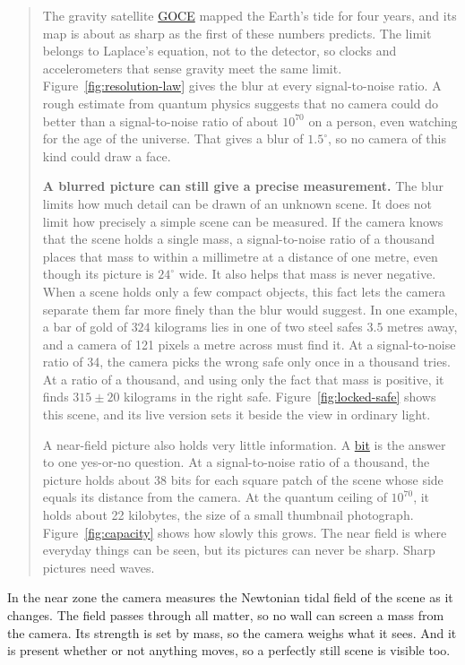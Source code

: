 \begin{quote}
The gravity satellite \href{https://en.wikipedia.org/wiki/GOCE}{GOCE} mapped the
Earth's tide for four years, and its map is about as sharp as the first of these
numbers predicts. The limit belongs to Laplace's equation, not to the detector,
so clocks and accelerometers that sense gravity meet the same limit. Figure~\ref{fig:resolution-law} gives the blur at every signal-to-noise ratio. A rough
estimate from quantum physics suggests that no camera could do better than a
signal-to-noise ratio of about $10^{70}$ on a person, even watching for the age
of the universe. That gives a blur of $1.5^\circ$, so no camera of this kind
could draw a face.

\textbf{A blurred picture can still give a precise measurement.} The blur limits
how much detail can be drawn of an unknown scene. It does not limit how
precisely a simple scene can be measured. If the camera knows that the scene
holds a single mass, a signal-to-noise ratio of a thousand places that mass to
within a millimetre at a distance of one metre, even though its picture is
$24^\circ$ wide. It also helps that mass is never negative. When a scene holds
only a few compact objects, this fact lets the camera separate them far more
finely than the blur would suggest. In one example, a bar of gold of
$324$ kilograms lies in one of two steel safes $3.5$ metres away, and a camera
of 121 pixels a metre across must find it. At a signal-to-noise ratio of 34,
the camera picks the wrong safe only once in a thousand tries. At a ratio of a
thousand, and using only the fact that mass is positive, it finds $315 \pm 20$
kilograms in the right safe. Figure~\ref{fig:locked-safe} shows this scene, and its live version sets it beside the view in ordinary light.

A near-field picture also holds very little information. A
\href{https://en.wikipedia.org/wiki/Bit}{bit} is the answer to one yes-or-no
question. At a signal-to-noise ratio of a thousand, the picture holds about 38
bits for each square patch of the scene whose side equals its distance from the
camera. At the quantum ceiling of $10^{70}$, it holds about 22 kilobytes, the
size of a small thumbnail photograph. Figure~\ref{fig:capacity} shows how slowly this grows. The near field is where everyday things
can be seen, but its pictures can never be sharp. Sharp pictures need waves.
\end{quote}

In the near zone the camera measures the Newtonian tidal field of the scene as
it changes. The field passes through all
matter, so no wall can screen a mass from the camera. Its strength is set by mass,
so the camera weighs what it sees. And it is present whether or not anything
moves, so a perfectly still scene is visible too.

